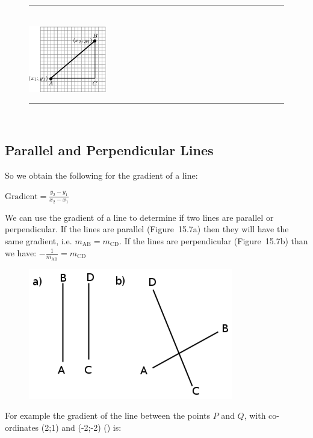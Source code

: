 	\begin{figure}[H] %
    \begin{center}
    \rule[.1in]{\figurerulewidth}{.005in} \\
        \label{m39108*uid42!!!underscore!!!media}\label{m39108*uid42!!!underscore!!!printimage}\includegraphics{col11306.imgs/m39108_MG10C14_018.png} %
      \vspace{2pt}
    \vspace{.1in}
    \rule[.1in]{\figurerulewidth}{.005in} \\
    \end{center}
 \end{figure}   \subsection{Parallel and Perpendicular Lines}    
        \label{m39108*eip-127}So we obtain the following for the gradient of a line:\par \label{m39108*id68147}$\mathrm{Gradient}=\frac{{y}_{2}-{y}_{1}}{{x}_{2}-{x}_{1}}$\par 
        \label{m39108*eip-332}We can use the gradient of a line to determine if two lines are parallel or perpendicular. If the lines are parallel (Figure~15.7a) then they will have the same gradient, i.e. ${m}_{\mathrm{AB}}={m}_{\mathrm{CD}}$. If the lines are perpendicular (Figure~15.7b) than we have: $-\frac{1}{{m}_{\mathrm{AB}}}={m}_{\mathrm{CD}}$
    \setcounter{subfigure}{0}
	\begin{figure}[H] %
    \begin{center}
    \label{m39108*uid4212!!!underscore!!!media}\label{m39108*uid4212!!!underscore!!!printimage}\includegraphics[width=0.4\columnwidth]{col11306.imgs/m39108_geom.png} %
      \vspace{2pt}
    \vspace{.1in}
    \end{center}
 \end{figure}       
\par \label{m39108*id68198}For example the gradient of the line between the points $P$ and $Q$, with co-ordinates (2;1) and (-2;-2) () is:\par 
        \label{m39108*id68224}\nopagebreak\noindent{}
          
